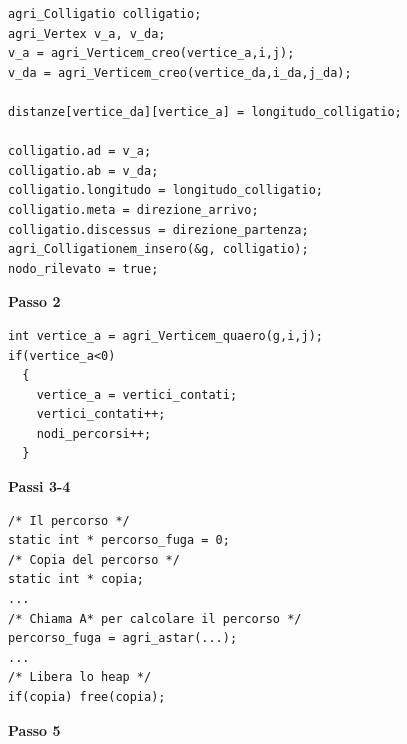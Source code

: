 \documentclass[8pt]{book}
\begin{document}
\begin{spacing}{0.9}
  \begin{small}
\begin{tcolorbox}
\begin{verbatim}
agri_Colligatio colligatio;
agri_Vertex v_a, v_da;
v_a = agri_Verticem_creo(vertice_a,i,j);
v_da = agri_Verticem_creo(vertice_da,i_da,j_da);

distanze[vertice_da][vertice_a] = longitudo_colligatio;

colligatio.ad = v_a;
colligatio.ab = v_da;
colligatio.longitudo = longitudo_colligatio;
colligatio.meta = direzione_arrivo;
colligatio.discessus = direzione_partenza;
agri_Colligationem_insero(&g, colligatio);
nodo_rilevato = true;
\end{verbatim}
    \end{tcolorbox}
  \end{small}
\end{spacing}

\textbf{Passo 2}

\begin{spacing}{0.9}
  \begin{small}
    \begin{tcolorbox}
\begin{verbatim}
int vertice_a = agri_Verticem_quaero(g,i,j);
if(vertice_a<0)
  {
    vertice_a = vertici_contati;
    vertici_contati++;
    nodi_percorsi++;
  }
\end{verbatim}
  \end{tcolorbox}
    \end{small}
      \end{spacing}

\textbf{Passi 3-4}

\begin{spacing}{0.9}
  \begin{small}
    \begin{tcolorbox}
\begin{verbatim}
/* Il percorso */
static int * percorso_fuga = 0;
/* Copia del percorso */
static int * copia;
...
/* Chiama A* per calcolare il percorso */
percorso_fuga = agri_astar(...);
...
/* Libera lo heap */
if(copia) free(copia);
\end{verbatim}
  \end{tcolorbox}
    \end{small}
      \end{spacing}

\textbf{Passo 5}
\end{document}
